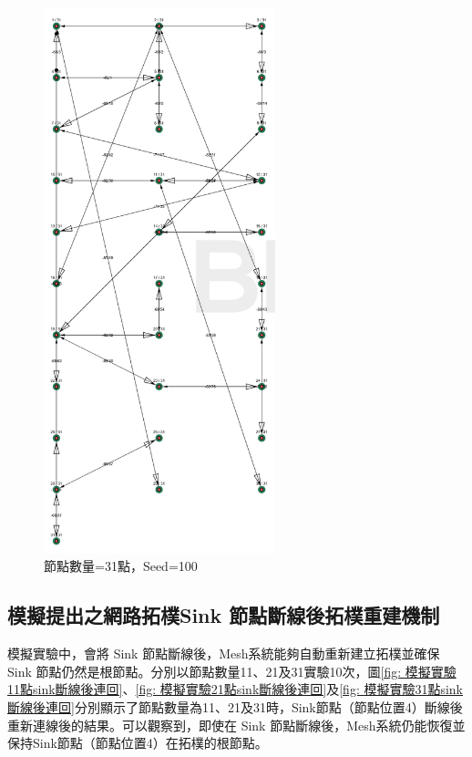 \begin{ZhChapter}
\begin{figure}[H]
    \centering
    \includegraphics[width = 0.6\textwidth]{image/模擬實驗31點seed=100.png}
    \caption{節點數量=31點，Seed=100}
    \label{fig: 模擬實驗31點seed=100}
\end{figure}

\subsection{模擬提出之網路拓樸Sink 節點斷線後拓樸重建機制}
模擬實驗中，會將 Sink 節點斷線後，Mesh系統能夠自動重新建立拓樸並確保 Sink 節點仍然是根節點。分別以節點數量11、21及31實驗10次，圖\ref{fig: 模擬實驗11點sink斷線後連回}、\ref{fig: 模擬實驗21點sink斷線後連回}及\ref{fig: 模擬實驗31點sink斷線後連回}分別顯示了節點數量為11、21及31時，Sink節點（節點位置4）斷線後重新連線後的結果。可以觀察到，即使在 Sink 節點斷線後，Mesh系統仍能恢復並保持Sink節點（節點位置4）在拓樸的根節點。


\end{ZhChapter}
